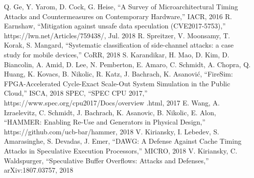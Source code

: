 \begin{thebibliography}{00}
     Q. Ge, Y. Yarom, D. Cock, G. Heise, ``A Survey of Microarchitectural Timing Attacks and Countermeasures on Contemporary Hardware,'' IACR, 2016
     R. Earnshaw, ``Mitigation against unsafe data speculation (CVE2017-5753),'' https://lwn.net/Articles/759438/, Jul. 2018
     R. Spreitzer, V. Moonsamy, T. Korak, S. Mangard, ``Systematic classification of side-channel attacks: a case study for mobile devices,'' CoRR, 2018
     S. Karandikar, H. Mao, D. Kim, D. Biancolin, A. Amid, D. Lee, N. Pemberton, E. Amaro, C. Schmidt, A. Chopra, Q. Huang, K. Kovacs, B. Nikolic, R. Katz, J. Bachrach, K. Asanović, ``FireSim: FPGA-Accelerated Cycle-Exact Scale-Out System Simulation in the Public Cloud,'' ISCA, 2018
     SPEC, ``SPEC CPU 2017,'' https://www.spec.org/cpu2017/Docs/overview .html, 2017
     E. Wang, A. Izraelevitz, C. Schmidt, J. Bachrach, K. Asanovic, B. Nikolic, E. Alon, ``HAMMER: Enabling Re-Use and Generators in Physical Design,'' https://github.com/ucb-bar/hammer, 2018
     V. Kiriansky, I. Lebedev, S. Amarasinghe, S. Devadas, J. Emer, ``DAWG: A Defense Against Cache Timing Attacks in Speculative Execution Processors,'' MICRO, 2018
     V. Kiriansky, C. Waldspurger, ``Speculative Buffer Overflows: Attacks and Defenses,'' arXiv:1807.03757, 2018
\end{thebibliography}

